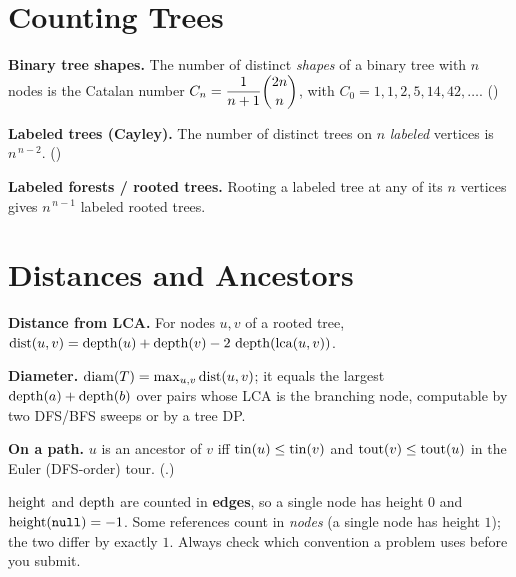 \section{Counting Trees}

\begin{tcolorbox}[mathbase, colback=white, colframe=successgreen, title={How many trees are there? (Chapter 1)}, colbacktitle=successgreen]
\textbf{Binary tree shapes.} The number of distinct \emph{shapes} of a binary tree
with $n$ nodes is the Catalan number
$C_n=\dfrac{1}{n+1}\dbinom{2n}{n}$, with $C_0=1,1,2,5,14,42,\dots$. \hfill ()

\textbf{Labeled trees (Cayley).} The number of distinct trees on $n$ \emph{labeled}
vertices is $n^{\,n-2}$. \hfill ()

\textbf{Labeled forests / rooted trees.} Rooting a labeled tree at any of its $n$
vertices gives $n^{\,n-1}$ labeled rooted trees.
\end{tcolorbox}

\section{Distances and Ancestors}

\begin{tcolorbox}[mathbase, colback=white, colframe=accentorange, title={Paths via LCA (\chref{c09} and \chref{c11})}, colbacktitle=accentorange]
\textbf{Distance from LCA.} For nodes $u,v$ of a rooted tree,
$\operatorname{dist}(u,v)=\operatorname{depth}(u)+\operatorname{depth}(v)-2\,\operatorname{depth}(\operatorname{lca}(u,v))$.

\textbf{Diameter.} $\operatorname{diam}(T)=\max_{u,v}\operatorname{dist}(u,v)$; it equals the largest
$\operatorname{depth}(a)+\operatorname{depth}(b)$ over pairs whose LCA is the branching node, computable by two
DFS/BFS sweeps or by a tree DP.

\textbf{On a path.} $u$ is an ancestor of $v$ iff $\operatorname{tin}(u)\le\operatorname{tin}(v)$ and
$\operatorname{tout}(v)\le\operatorname{tout}(u)$ in the Euler (DFS-order) tour. (.)
\end{tcolorbox}

\begin{notebox}
$\operatorname{height}$ and $\operatorname{depth}$ are counted in \textbf{edges}, so a single node has height
$0$ and $\operatorname{height}(\texttt{null})=-1$. Some references count in \emph{nodes} (a single node has
height $1$); the two differ by exactly $1$. Always check which convention a problem
uses before you submit.
\end{notebox}
